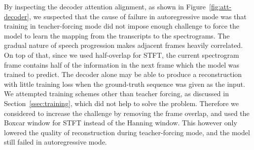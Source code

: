 \documentclass[11pt]{article}
\begin{document}
By inspecting the decoder attention alignment, as shown in Figure~\ref{fig:att-decoder},
we suspected that the cause of failure in autoregressive mode was that training in teacher-forcing mode
did not impose enough challenge to force the model to learn the mapping from the transcripts to the spectrograms.
The gradual nature of speech progression makes adjacent frames heavily correlated.
On top of that, since we used half-overlap for STFT,
the current spectrogram frame contains half of the information
in the next frame which the model was trained to predict.
The decoder alone may be able to produce a reconstruction with little training loss
when the ground-truth sequence was given as the input.
We attempted training schemes other than teacher forcing,
as discussed in Section~\ref{ssec:training},
which did not help to solve the problem.
Therefore we considered to increase the challenge by removing the frame overlap,
and used the Boxcar window for STFT instead of the Hanning window.
This however only lowered the quality of reconstruction during teacher-forcing mode,
and the model still failed in autoregressive mode.
\end{document}
